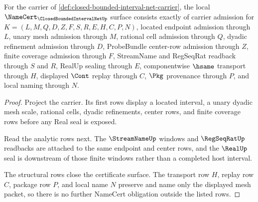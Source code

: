 \begin{theorem}
\label{thm:closed-bounded-interval-net-namecert-obligations}
For the carrier of \autoref{def:closed-bounded-interval-net-carrier}, the local $\NameCert_{\ClosedBoundedIntervalNetUp}$ surface consists exactly of carrier admission for $K=(L,M,Q,D,Z,F,S,R,E,H,C,P,N)$, located endpoint admission through $L$, unary mesh admission through $M$, rational cell admission through $Q$, dyadic refinement admission through $D$, ProbeBundle center-row admission through $Z$, finite coverage admission through $F$, StreamName and RegSeqRat readback through $S$ and $R$, RealUp sealing through $E$, componentwise $\hsame$ transport through $H$, displayed $\Cont$ replay through $C$, $\Pkg$ provenance through $P$, and local naming through $N$.
\end{theorem}
\begin{proof}
Project the carrier. Its first rows display a located interval, a unary dyadic mesh scale, rational cells, dyadic refinements, center rows, and finite coverage rows before any Real seal is exposed.

Read the analytic rows next. The $\StreamNameUp$ windows and $\RegSeqRatUp$ readbacks are attached to the same endpoint and center rows, and the $\RealUp$ seal is downstream of those finite windows rather than a completed host interval.

The structural rows close the certificate surface. The transport row $H$, replay row $C$, package row $P$, and local name $N$ preserve and name only the displayed mesh packet, so there is no further NameCert obligation outside the listed rows.
\end{proof}

